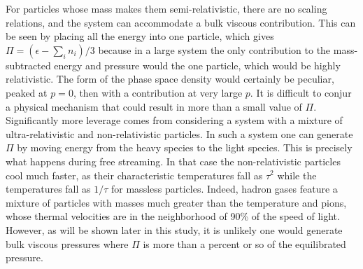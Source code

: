 For particles whose mass makes them semi-relativistic, there are no scaling relations, and the system can accommodate a bulk viscous contribution. This can be seen by placing all the energy into one particle, which gives $\Pi=(\epsilon-\sum_in_i)/3$ because in a large system the only contribution to the mass-subtracted energy and pressure would the one particle, which would be highly relativistic. The form of the phase space density would certainly be peculiar, peaked at $p=0$, then with a contribution at very large $p$. It is difficult to conjur a physical mechanism that could result in more than a small value of $\Pi$. Significantly more leverage comes from considering a system with a mixture of ultra-relativistic and non-relativistic particles. In such a system one can generate $\Pi$ by moving energy from the heavy species to the light species. This is precisely what happens during free streaming. In that case the non-relativistic particles cool much faster, as their characteristic temperatures fall as $\tau^2$ while the temperatures fall as $1/\tau$ for massless particles. Indeed, hadron gases feature a mixture of particles with masses much greater than the temperature and pions, whose thermal velocities are in the neighborhood of 90\% of the speed of light. However, as will be shown later in this study, it is unlikely one would generate bulk viscous pressures where $\Pi$ is more than a percent or so of the equilibrated pressure. 

